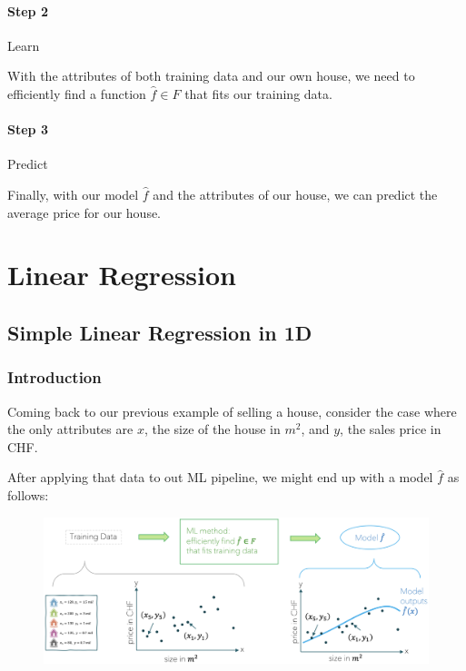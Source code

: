\documentclass[a4paper]{extarticle}
\begin{document}
\paragraph{Step 2} Learn

With the attributes of both training data and our own house, we need to efficiently find a function \(\hat{f} \in F\) that fits our training data.

\paragraph{Step 3} Predict

Finally, with our model \(\hat{f}\) and the attributes of our house, we can predict the average price for our house.

\section{Linear Regression}

\subsection{Simple Linear Regression in 1D}

\subsubsection{Introduction}

Coming back to our previous example of selling a house, consider the case where the only attributes are \(x\), the size of the house in \(m^2\), and \(y\), the sales price in CHF.

After applying that data to out ML pipeline, we might end up with a model \(\hat{f}\) as follows:

\begin{figure}[H]
	\includegraphics[width = 15cm]{../images/IntroML_Fig1-3}
	\centering
\end{figure}
\end{document}
